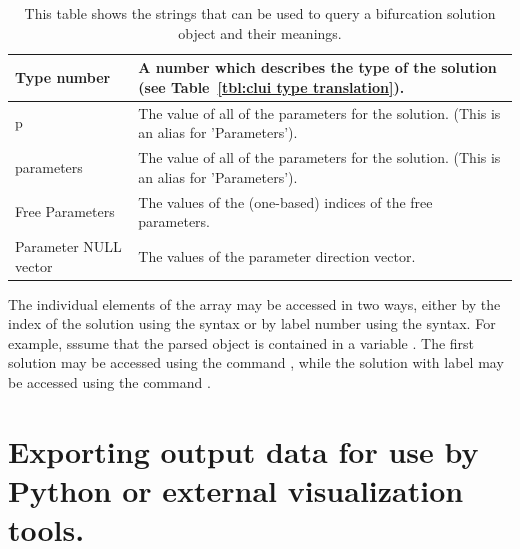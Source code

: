 \documentclass[12pt]{report}
\begin{document}
\begin{table}[htbp]
\begin{center}
\begin{tabular}{| l | l |}
 \hline
 Type number & \begin{minipage}{4in} \smallskip A number which describes the type of the solution (see Table~\ref{tbl:clui type translation}).  \smallskip \end{minipage} \\  
 \hline
 p & \begin{minipage}{4in} \smallskip The value of all of the parameters for the solution. (This is an alias for 'Parameters'). \smallskip \end{minipage} \\  
 \hline
 parameters & \begin{minipage}{4in} \smallskip The value of all of the parameters for the solution. (This is an alias for 'Parameters').\smallskip \end{minipage} \\  
 \hline
 Free Parameters & \begin{minipage}{4in} \smallskip
 The values of the (one-based) indices of the free parameters.
 \smallskip \end{minipage} \\  
 \hline
 Parameter NULL vector & \begin{minipage}{4in} \smallskip The values
 of the parameter direction vector.\smallskip \end{minipage} \\  
 \hline
 \end{tabular}
 \caption[Contents of a bifurcation solution object.]
 {This table shows the strings that can be used to
 query a bifurcation solution object and their
 meanings.}
 \label{tbl:clui parse solution}
 \end{center}
 \end{table}

 The individual elements of the array may be accessed 
 in two ways, either by the index of the solution using the
 \commandf{[]} syntax or by label number using the
 \commandf{()} syntax.  For example, sssume that the parsed object is contained
 in a variable .  
 The first solution may be accessed 
 using the command , while the solution with
 label  may be accessed using the command .

 \section{Exporting output data for use by Python or external
   visualization tools.} \label{sec:clui_exporting}
\end{document}
